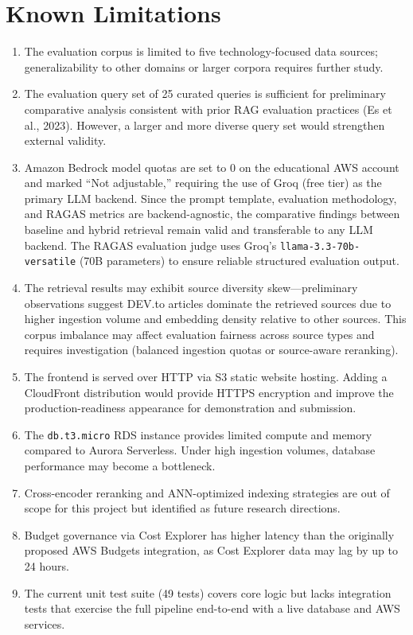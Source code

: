 \documentclass[12pt,a4paper]{report}
\begin{document}
\section{Known Limitations}
\label{sec:limitations}

\begin{enumerate}[leftmargin=0.5in]
  \item The evaluation corpus is limited to five technology-focused data sources; generalizability to other domains or larger corpora requires further study.

  \item The evaluation query set of 25 curated queries is sufficient for preliminary comparative analysis consistent with prior RAG evaluation practices (Es et al., 2023). However, a larger and more diverse query set would strengthen external validity.

  \item Amazon Bedrock model quotas are set to 0 on the educational AWS account and marked ``Not adjustable,'' requiring the use of Groq (free tier) as the primary LLM backend. Since the prompt template, evaluation methodology, and RAGAS metrics are backend-agnostic, the comparative findings between baseline and hybrid retrieval remain valid and transferable to any LLM backend. The RAGAS evaluation judge uses Groq's \texttt{llama-3.3-70b-versatile} (70B parameters) to ensure reliable structured evaluation output.

  \item The retrieval results may exhibit source diversity skew---preliminary observations suggest DEV.to articles dominate the retrieved sources due to higher ingestion volume and embedding density relative to other sources. This corpus imbalance may affect evaluation fairness across source types and requires investigation (balanced ingestion quotas or source-aware reranking).

  \item The frontend is served over HTTP via S3 static website hosting. Adding a CloudFront distribution would provide HTTPS encryption and improve the production-readiness appearance for demonstration and submission.

  \item The \texttt{db.t3.micro} RDS instance provides limited compute and memory compared to Aurora Serverless. Under high ingestion volumes, database performance may become a bottleneck.

  \item Cross-encoder reranking and ANN-optimized indexing strategies are out of scope for this project but identified as future research directions.

  \item Budget governance via Cost Explorer has higher latency than the originally proposed AWS Budgets integration, as Cost Explorer data may lag by up to 24 hours.

  \item The current unit test suite (49 tests) covers core logic but lacks integration tests that exercise the full pipeline end-to-end with a live database and AWS services.
\end{enumerate}
\end{document}
